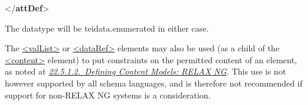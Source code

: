 \begin{shaded}
\hspace*{1em}\hspace*{1em}\mbox{}\newline 
\hspace*{1em}\mbox{}\newline 
{}\mbox{}\newline 
{</\textbf{attDef}>}\end{shaded}\egroup\par \noindent  The datatype will be \textsf{teidata.enumerated} in either case.\par
The \hyperref[TEI.valList]{<valList>} or \hyperref[TEI.dataRef]{<dataRef>} elements may also be used (as a child of the \hyperref[TEI.content]{<content>} element) to put constraints on the permitted content of an element, as noted at \textit{\hyperref[TDTAGCONT]{22.5.1.2.\ Defining Content Models: RELAX NG}}. This use is not however supported by all schema languages, and is therefore not recommended if support for non-RELAX NG systems is a consideration.
